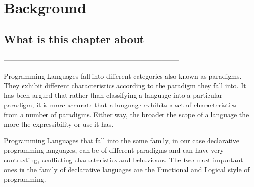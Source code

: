 \documentclass[thesis-solanki.tex]{subfiles}
\begin{document}
\chapter{Background}\label{chap:background}

\section{What is this chapter about}

-----------------------------------------------------------------------------

Programming Languages fall into different categories also known as
paradigms. They exhibit different characteristics according to the paradigm they
fall into.
It has been argued \cite{Krishnamurthi:2008:TPL:1480828.1480846} that
rather than classifying a language into a particular paradigm,
it is
more accurate that a language exhibits a set of characteristics from a
number of paradigms.
Either way, the broader the scope of a language the more the
expressibility or use it has.

Programming Languages that fall into the same family, in our case declarative programming languages, can be of
different paradigms and can have very contrasting, conflicting characteristics and behaviours. The two most
important ones in the family of declarative languages are the Functional and Logical style of programming.
\end{document}
